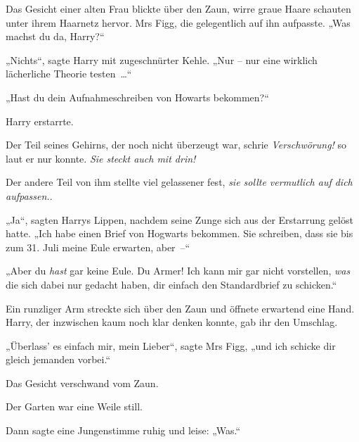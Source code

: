 Das Gesicht einer alten Frau blickte über den Zaun, wirre graue Haare schauten unter ihrem Haarnetz hervor. Mrs Figg, die gelegentlich auf ihn aufpasste. „Was machst du da, Harry?“

„Nichts“, sagte Harry mit zugeschnürter Kehle. „Nur – nur eine wirklich lächerliche Theorie testen …“

„Hast du dein Aufnahmeschreiben von Howarts bekommen?“

Harry erstarrte.

Der Teil seines Gehirns, der noch nicht überzeugt war, schrie \emph{Verschwörung!} so laut er nur konnte. \emph{Sie steckt auch mit drin!}

Der andere Teil von ihm stellte viel gelassener fest, \emph{sie sollte vermutlich auf dich aufpassen.}.

„Ja“, sagten Harrys Lippen, nachdem seine Zunge sich aus der Erstarrung gelöst hatte. „Ich habe einen Brief von Hogwarts bekommen. Sie schreiben, dass sie bis zum 31. Juli meine Eule erwarten, aber –“

„Aber du \emph{hast} gar keine Eule. Du Armer! Ich kann mir gar nicht vorstellen, \emph{was} die sich dabei nur gedacht haben, dir einfach den Standardbrief zu schicken.“

Ein runzliger Arm streckte sich über den Zaun und öffnete erwartend eine Hand. Harry, der inzwischen kaum noch klar denken konnte, gab ihr den Umschlag.

„Überlass' es einfach mir, mein Lieber“, sagte Mrs Figg, „und ich schicke dir gleich jemanden vorbei.“

Das Gesicht verschwand vom Zaun.

Der Garten war eine Weile still.

Dann sagte eine Jungenstimme ruhig und leise: „Was.“
